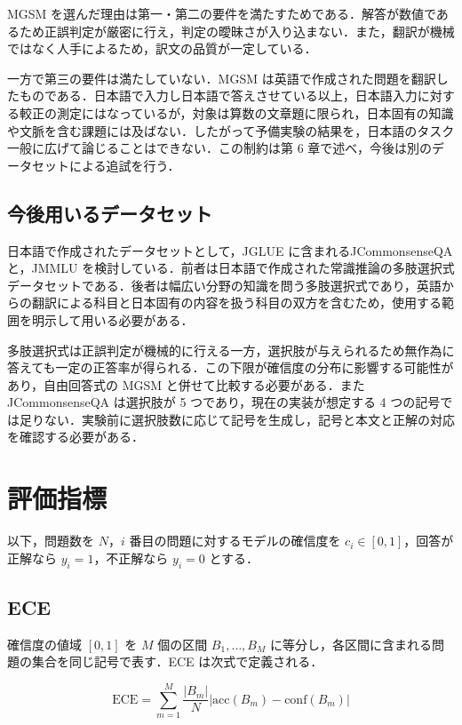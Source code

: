 MGSM を選んだ理由は第一・第二の要件を満たすためである．解答が数値であるため正誤判定が厳密に行え，判定の曖昧さが入り込まない．また，翻訳が機械ではなく人手によるため，訳文の品質が一定している．

一方で第三の要件は満たしていない．MGSM は英語で作成された問題を翻訳したものである．日本語で入力し日本語で答えさせている以上，日本語入力に対する較正の測定にはなっているが，対象は算数の文章題に限られ，日本固有の知識や文脈を含む課題には及ばない．したがって予備実験の結果を，日本語のタスク一般に広げて論じることはできない．この制約は第 6 章で述べ，今後は別のデータセットによる追試を行う．

\subsection{今後用いるデータセット}

日本語で作成されたデータセットとして，JGLUE \cite{kurihara2022jglue} に含まれるJCommonsenseQA と，JMMLU を検討している．前者は日本語で作成された常識推論の多肢選択式データセットである．後者は幅広い分野の知識を問う多肢選択式であり，英語からの翻訳による科目と日本固有の内容を扱う科目の双方を含むため，使用する範囲を明示して用いる必要がある．

多肢選択式は正誤判定が機械的に行える一方，選択肢が与えられるため無作為に答えても一定の正答率が得られる．この下限が確信度の分布に影響する可能性があり，自由回答式の MGSM と併せて比較する必要がある．また JCommonsenseQA は選択肢が 5 つであり，現在の実装が想定する 4 つの記号では足りない．実験前に選択肢数に応じて記号を生成し，記号と本文と正解の対応を確認する必要がある．

\section{評価指標}

以下，問題数を $N$，$i$ 番目の問題に対するモデルの確信度を $c_i \in [0,1]$，回答が正解なら $y_i = 1$，不正解なら $y_i = 0$ とする．

\subsection{ECE}

確信度の値域 $[0,1]$ を $M$ 個の区間 $B_1, \dots, B_M$ に等分し，各区間に含まれる問題の集合を同じ記号で表す．ECE は次式で定義される．

\begin{equation}
\mathrm{ECE} = \sum_{m=1}^{M} \frac{|B_m|}{N} \bigl| \mathrm{acc}(B_m) - \mathrm{conf}(B_m) \bigr|
\end{equation}

